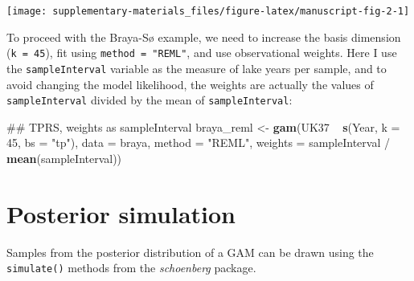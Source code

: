 \documentclass[12pt,]{article}
\newenvironment{Shaded}{\begin{snugshade}}{\end{snugshade}}
\newcommand{\KeywordTok}[1]{\textcolor[rgb]{0.13,0.29,0.53}{\textbf{{#1}}}}
\newcommand{\DataTypeTok}[1]{\textcolor[rgb]{0.13,0.29,0.53}{{#1}}}
\newcommand{\DecValTok}[1]{\textcolor[rgb]{0.00,0.00,0.81}{{#1}}}
\newcommand{\StringTok}[1]{\textcolor[rgb]{0.31,0.60,0.02}{{#1}}}
\newcommand{\NormalTok}[1]{{#1}}
\begin{document}
\begin{center}\texttt{[image: supplementary-materials\_files/figure-latex/manuscript-fig-2-1]} \end{center}

To proceed with the Braya-Sø example, we need to increase the basis
dimension (\texttt{k\ =\ 45}), fit using \texttt{method\ =\ "REML"}, and
use observational weights. Here I use the \texttt{sampleInterval}
variable as the measure of lake years per sample, and to avoid changing
the model likelihood, the weights are actually the values of
\texttt{sampleInterval} divided by the mean of \texttt{sampleInterval}:

\begin{Shaded}
\begin{Highlighting}[]
\NormalTok{## TPRS, weights as sampleInterval}
\NormalTok{braya_reml <-}\StringTok{ }\KeywordTok{gam}\NormalTok{(UK37 ~}\StringTok{ }\KeywordTok{s}\NormalTok{(Year, }\DataTypeTok{k =} \DecValTok{45}\NormalTok{, }\DataTypeTok{bs =} \StringTok{"tp"}\NormalTok{), }\DataTypeTok{data =} \NormalTok{braya,}
                  \DataTypeTok{method =} \StringTok{"REML"}\NormalTok{,}
                  \DataTypeTok{weights =} \NormalTok{sampleInterval /}\StringTok{ }\KeywordTok{mean}\NormalTok{(sampleInterval))}
\end{Highlighting}
\end{Shaded}

\section{Posterior simulation}\label{posterior-simulation}

Samples from the posterior distribution of a GAM can be drawn using the
\texttt{simulate()} methods from the \emph{schoenberg} package.
\end{document}
